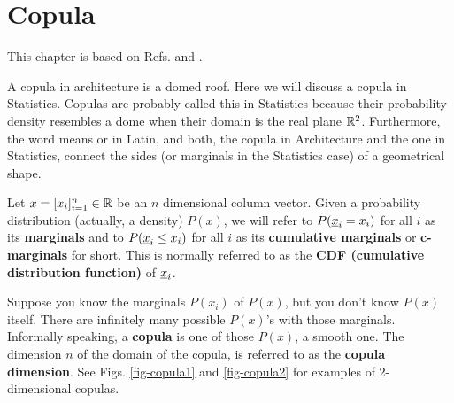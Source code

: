 \chapter{Copula}
\label{ch-copula}

This chapter is based 
on Refs.\cite{wiki-copula}
and \cite{copula-bo}.

A copula in architecture is a domed roof. Here we will discuss a copula in Statistics.
Copulas are probably called this in Statistics
because their probability density resembles a dome when their domain is 
the real plane ${ \mathbb{R}}^2$.
Furthermore,
the word  means
 or  in Latin,
and both,
the copula in Architecture
and the one in Statistics,
connect the sides (or marginals in the
Statistics case) of a geometrical 
shape.

Let $x= [x_i]_{i=1}^n\in{ \mathbb{R}}$ be an $n$ 
dimensional column vector.
Given a probability
distribution (actually, a density) $P(x)$,
we will refer to $P(\rvx_i=x_i)$ for all $i$
as its {\bf marginals}
and to $P(\rvx_i\leq x_i)$ for all $i$
as its {\bf cumulative marginals} or {\bf c-marginals} for short.
This is normally referred
to as the {\bf CDF (cumulative
distribution function)} of $\rvx_i$.

Suppose you know the marginals $P(x_i)$ 
of  $P(x)$,
but you don't know $P(x)$
itself. There are
infinitely many
possible $P(x)$'s
with those marginals.
Informally
speaking,
a {\bf copula} is one of those
$P(x)$, a smooth one.
The dimension $n$ of
the domain of the copula,
is referred to as the
{\bf copula dimension}.
See Figs. \ref{fig-copula1}
and \ref{fig-copula2}
for examples of 2-dimensional copulas.

